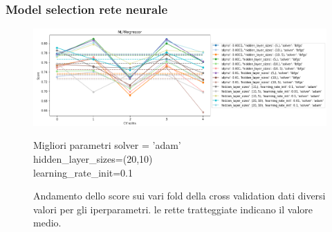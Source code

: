 \documentclass{beamer}
\begin{document}
\begin{frame}
	\frametitle{Model selection rete neurale}
	\begin{figure}[ht]
		\centering
		\includegraphics[width=\textwidth]{nncv.png}
		\caption{Andamento dello score sui vari fold della cross validation dati
		diversi valori per gli iperparametri. le rette tratteggiate indicano il
		valore medio.}
		\begin{alertblock}{Migliori parametri}
			solver = 'adam'\\
			hidden\_layer\_sizes=(20,10)\\
			learning\_rate\_init=0.1
		\end{alertblock}
	\end{figure}
\end{frame}
\end{document}
